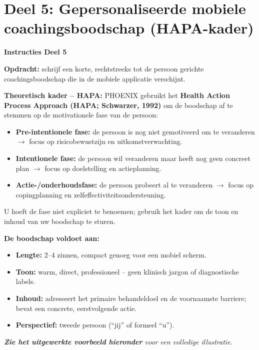 \documentclass[11pt,a4paper]{article}
\begin{document}
\vspace{0.6em}
\newpage


\section{Deel 5: Gepersonaliseerde mobiele coachingsboodschap (HAPA-kader)}

\begin{tcolorbox}[colback=red!3,colframe=ForestGreen,arc=2.5mm,boxrule=0.9pt,
  left=10pt,right=10pt,top=9pt,bottom=9pt]
\textbf{\color{ForestGreen}Instructies Deel 5}

\smallskip\small
\textbf{Opdracht:} schrijf een korte, rechtstreeks tot de persoon gerichte
coachingsboodschap die in de mobiele applicatie verschijnt.

\textbf{Theoretisch kader -- HAPA:}
PHOENIX gebruikt het \textbf{Health Action Process Approach (HAPA; Schwarzer, 1992)}
om de boodschap af te stemmen op de motivationele fase van de persoon:
\begin{itemize}[topsep=2pt,itemsep=1pt]
\item \textbf{Pre-intentionele fase:} de persoon is nog niet gemotiveerd om te veranderen
$\rightarrow$ focus op risicobewustzijn en uitkomstverwachting.
\item \textbf{Intentionele fase:} de persoon wil veranderen maar heeft nog geen concreet plan
$\rightarrow$ focus op doelstelling en actieplanning.
\item \textbf{Actie-/onderhoudsfase:} de persoon probeert al te veranderen
$\rightarrow$ focus op copingplanning en zelfeffectiviteitsondersteuning.
\end{itemize}
U hoeft de fase niet expliciet te benoemen; gebruik het kader om de toon en inhoud
van uw boodschap te sturen.

\textbf{De boodschap voldoet aan:}
\begin{itemize}[topsep=2pt,itemsep=2pt]
\item \textbf{Lengte:} 2--4 zinnen, compact genoeg voor een mobiel scherm.
\item \textbf{Toon:} warm, direct, professioneel -- geen klinisch jargon of diagnostische labels.
\item \textbf{Inhoud:} adresseert het primaire behandeldoel en de voornaamste barriere;
bevat een concrete, eerstvolgende actie.
\item \textbf{Perspectief:} tweede persoon (``jij'' of formeel ``u'').
\end{itemize}

\medskip
\textit{\textbf{Zie het uitgewerkte voorbeeld hieronder} voor een volledige illustratie.}
\end{tcolorbox}
\end{document}
